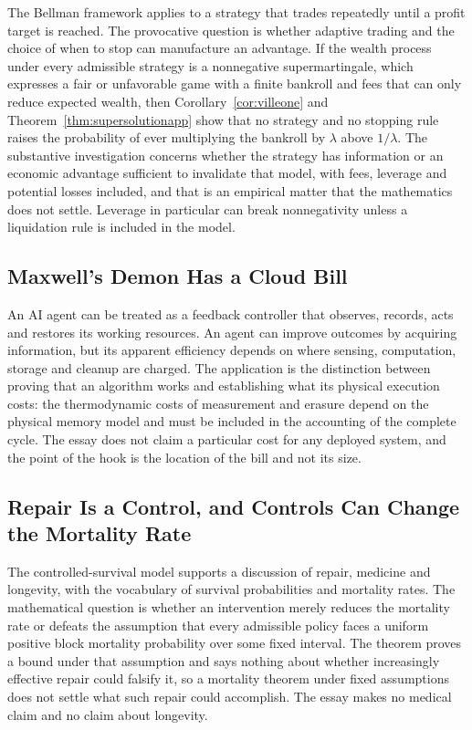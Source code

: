 \documentclass[11pt]{article}
\theoremstyle{definition}
\theoremstyle{remark}
\begin{document}
The Bellman framework applies to a strategy that trades repeatedly until a profit target is reached. The provocative question is whether adaptive trading and the choice of when to stop can manufacture an advantage. If the wealth process under every admissible strategy is a nonnegative supermartingale, which expresses a fair or unfavorable game with a finite bankroll and fees that can only reduce expected wealth, then Corollary~\ref{cor:villeone} and Theorem~\ref{thm:supersolutionapp} show that no strategy and no stopping rule raises the probability of ever multiplying the bankroll by $\lambda$ above $1/\lambda$. The substantive investigation concerns whether the strategy has information or an economic advantage sufficient to invalidate that model, with fees, leverage and potential losses included, and that is an empirical matter that the mathematics does not settle. Leverage in particular can break nonnegativity unless a liquidation rule is included in the model.

\subsection{Maxwell's Demon Has a Cloud Bill}

An AI agent can be treated as a feedback controller that observes, records, acts and restores its working resources. An agent can improve outcomes by acquiring information, but its apparent efficiency depends on where sensing, computation, storage and cleanup are charged. The application is the distinction between proving that an algorithm works and establishing what its physical execution costs: the thermodynamic costs of measurement and erasure depend on the physical memory model and must be included in the accounting of the complete cycle. The essay does not claim a particular cost for any deployed system, and the point of the hook is the location of the bill and not its size.

\subsection{Repair Is a Control, and Controls Can Change the Mortality Rate}

The controlled-survival model supports a discussion of repair, medicine and longevity, with the vocabulary of survival probabilities and mortality rates. The mathematical question is whether an intervention merely reduces the mortality rate or defeats the assumption that every admissible policy faces a uniform positive block mortality probability over some fixed interval. The theorem proves a bound under that assumption and says nothing about whether increasingly effective repair could falsify it, so a mortality theorem under fixed assumptions does not settle what such repair could accomplish. The essay makes no medical claim and no claim about longevity.
\end{document}
